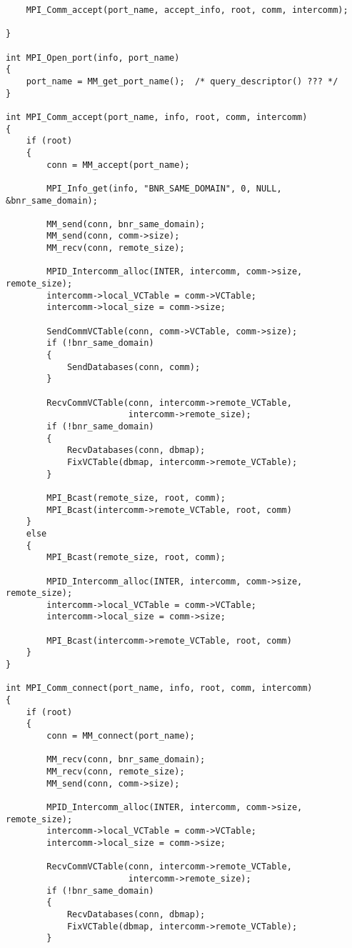 \documentclass{article}
\begin{document}
\begin{verbatim}
    MPI_Comm_accept(port_name, accept_info, root, comm, intercomm);
    
}

int MPI_Open_port(info, port_name)
{
    port_name = MM_get_port_name();  /* query_descriptor() ??? */
}

int MPI_Comm_accept(port_name, info, root, comm, intercomm)
{
    if (root)
    {
        conn = MM_accept(port_name);

        MPI_Info_get(info, "BNR_SAME_DOMAIN", 0, NULL, &bnr_same_domain);

        MM_send(conn, bnr_same_domain);
        MM_send(conn, comm->size);
        MM_recv(conn, remote_size);
        
        MPID_Intercomm_alloc(INTER, intercomm, comm->size, remote_size);
        intercomm->local_VCTable = comm->VCTable;
        intercomm->local_size = comm->size;
        
        SendCommVCTable(conn, comm->VCTable, comm->size);
        if (!bnr_same_domain)
        {
            SendDatabases(conn, comm);
        }
        
        RecvCommVCTable(conn, intercomm->remote_VCTable,
                        intercomm->remote_size);
        if (!bnr_same_domain)
        {
            RecvDatabases(conn, dbmap);
            FixVCTable(dbmap, intercomm->remote_VCTable);
        }

        MPI_Bcast(remote_size, root, comm);
        MPI_Bcast(intercomm->remote_VCTable, root, comm)
    }
    else
    {
        MPI_Bcast(remote_size, root, comm);
        
        MPID_Intercomm_alloc(INTER, intercomm, comm->size, remote_size);
        intercomm->local_VCTable = comm->VCTable;
        intercomm->local_size = comm->size;
        
        MPI_Bcast(intercomm->remote_VCTable, root, comm)
    }
}

int MPI_Comm_connect(port_name, info, root, comm, intercomm)
{
    if (root)
    {
        conn = MM_connect(port_name);
        
        MM_recv(conn, bnr_same_domain);
        MM_recv(conn, remote_size);
        MM_send(conn, comm->size);

        MPID_Intercomm_alloc(INTER, intercomm, comm->size, remote_size);
        intercomm->local_VCTable = comm->VCTable;
        intercomm->local_size = comm->size;
        
        RecvCommVCTable(conn, intercomm->remote_VCTable,
                        intercomm->remote_size);
        if (!bnr_same_domain)
        {
            RecvDatabases(conn, dbmap);
            FixVCTable(dbmap, intercomm->remote_VCTable);
        }
        

\end{verbatim}
\end{document}
